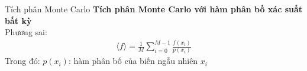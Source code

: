 \documentclass{beamer}
\begin{document}
\begin{frame}{Tích phân Monte Carlo}\vspace{4pt}
  \textbf{Tích phân Monte Carlo với hàm phân bố xác suất bất kỳ}\\
  \vspace{4em}
    Phương sai: 
  \begin{align}
    \langle{f}\rangle=\frac{1}{M}\sum_{i=0}^{M-1}{\frac{f(x_i)}{p(x_i)}}
  \end{align}
  \vspace{0.5em}
  Trong đó: 
  $p(x_i)$: hàm phân bố của biến ngẫu nhiên $x_i$\\
  \end{frame}
\end{document}
